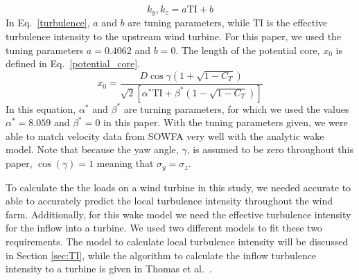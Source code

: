 \documentclass[11pt,letterpaper]{article}
\begin{document}
%
\begin{equation}
    \label{turbulence}
    k_y,k_z = a\text{TI}+b
\end{equation}
%
In Eq.~\ref{turbulence}, $a$ and $b$ are tuning parameters, while $\text{TI}$ is the effective turbulence intensity to the upstream wind turbine. For this paper, we used the tuning parameters $a=0.4062$ and $b=0$. The length of the potential core, $x_0$ is defined in Eq.~\ref{potential_core}.
%
\begin{equation}
    \label{potential_core}
    x_0 = \frac{D \cos{\gamma} (1 + \sqrt{1-C_T})}{\sqrt{2}[\alpha^*\text{TI} + \beta^* (1-\sqrt{1-C_T})]}
\end{equation}
% 
In this equation, $\alpha^*$ and $\beta^*$ are turning parameters, for which we used the values $\alpha^*=8.059$ and $\beta^*=0$ in this paper. With the tuning parameters given, we were able to match velocity data from SOWFA very well with the analytic wake model. 
% 
Note that because the yaw angle, $\gamma$, is assumed to be zero throughout this paper, $\cos(\gamma)=1$ meaning that $\sigma_y=\sigma_z$. 

To calculate the the loads on a wind turbine in this study, we needed accurate to able to accurately predict the local turbulence intensity throughout the wind farm. Additionally, for this wake model we need the effective turbulence intensity for the inflow into a turbine. We used two different models to fit these two requirements. The model to calculate local turbulence intensity will be discussed in Section \ref{sec:TI}, while the algorithm to calculate the inflow turbulence intensity to a turbine is given in Thomas et al.~\cite{Thomas2019}.
\end{document}
